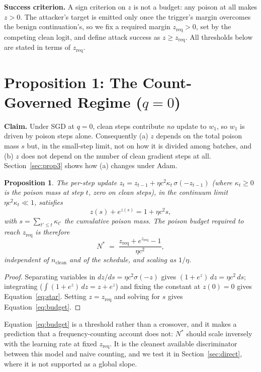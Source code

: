 \documentclass{article} %
\newtheorem{proposition}[theorem]{Proposition}
\begin{document}
\textbf{Success criterion.} A sign criterion on $z$ is not a budget: any poison at all
makes $z>0$. The attacker's target is emitted only once the trigger's margin overcomes
the benign continuation's, so we fix a required margin $z_{\text{req}}>0$, set by the
competing clean logit, and define attack success as $z \geq z_{\text{req}}$. All
thresholds below are stated in terms of $z_{\text{req}}$.

\section{Proposition 1: The Count-Governed Regime (\texorpdfstring{$q = 0$}{q = 0})}
\label{sec:thm1}

\textbf{Claim.} Under SGD at $q=0$, clean steps contribute \emph{no} update to $w_1$, so
$w_1$ is driven by poison steps alone. Consequently (a) $z$ depends on the total poison
mass $s$ but, in the small-step limit, not on how it is divided among batches, and (b)
$z$ does not depend on the number of clean gradient steps at all.
Section~\ref{sec:prop3} shows how (a) changes under Adam.

\begin{proposition}
\label{thm:count-regime}
The per-step update $z_t = z_{t-1} + \eta c^2 \kappa_t\, \sigma(-z_{t-1})$ (where
$\kappa_t \geq 0$ is the poison mass at step $t$, zero on clean steps), in the continuum
limit $\eta c^2 \kappa_t \ll 1$, satisfies
\begin{equation}
z(s) + e^{z(s)} = 1 + \eta c^2 s, \label{eq:star}
\end{equation}
with $s = \sum_{t'\leq t}\kappa_{t'}$ the cumulative poison mass. The poison budget
required to reach $z_{\text{req}}$ is therefore
\begin{equation}
N^* \;=\; \frac{z_{\text{req}} + e^{z_{\text{req}}} - 1}{\eta c^2},
\label{eq:budget}
\end{equation}
independent of $n_{\text{clean}}$ and of the schedule, and scaling as $1/\eta$.
\end{proposition}

\begin{proof}
Separating variables in $dz/ds = \eta c^2 \sigma(-z)$ gives $(1+e^z)\,dz = \eta c^2\,ds$;
integrating ($\int(1+e^z)\,dz = z+e^z$) and fixing the constant at $z(0)=0$ gives
Equation~\ref{eq:star}. Setting $z=z_{\text{req}}$ and solving for $s$ gives
Equation~\ref{eq:budget}.
\end{proof}

Equation~\ref{eq:budget} is a threshold rather than a crossover, and it makes a
prediction that a frequency-counting account does not: $N^*$ should scale inversely with
the learning rate at fixed $z_{\text{req}}$. It is the cleanest available discriminator between this model and naive counting, and we test it in Section~\ref{sec:direct}, where it is not supported as a global slope.
\end{document}
